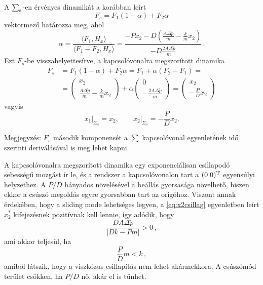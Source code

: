 A $\sum_{\rm s}$-en érvényes dinamikát a korábban leírt 
%
\begin{equation}
F_s = F_1 (1-\alpha) + F_2 \alpha 
\end{equation}
%
\noindent vektormező határozza meg, ahol
%
\begin{equation}
\alpha = \frac{\langle F_1, H_x \rangle}{\langle F_1-F_2, H_x \rangle} = \frac{-P x_2 -D \left(\frac{A \Delta \tilde{p}}{m} - \frac{k}{m} x_2\right)}{-D \frac{2A \Delta \tilde{p}}{m}} \,.
\end{equation}
%
\noindent Ezt $F_s$-be visszahelyettesítve, a kapcsolóvonalra megszorított dinamika
%
\begin{equation}
\begin{split}
F_s & = F_1 (1-\alpha) + F_2 \alpha = F_1 + \alpha (F_2-F_1) =  \\ & =
\begin{pmatrix}
x_2\\
\frac{A \Delta \tilde{p}}{m} - \frac{k}{m} x_2
\end{pmatrix} +
\alpha \begin{pmatrix}
0 \\
-\frac{2A \Delta \tilde{p}}{m}
\end{pmatrix} =
\begin{pmatrix}
x_2 \\
-\frac{P}{D}x_2
\end{pmatrix}
\end{split}
\end{equation}
%
\noindent vagyis
\begin{equation}
\left. \dot{x}_1 \right|_{\Sigma_s} = x_2, \qquad \left. \dot{x}_2 \right|_{\Sigma_s} = -\frac{P}{D} x_2.
\end{equation}
%

\underline{Megjegyzés:} $F_s$ második komponensét a $\sum$ kapcsolóvonal egyenletének idő szerinti deriválásával is meg lehet kapni.

A kapcsolóvonalra megszorított dinamika egy exponenciálisan csillapodó sebességű mozgást ír le, és a rendszer a kapcsolóvonalon tart a $(0 \; 0)^{\rm T}$ egyensúlyi helyzethez.  A $P/D$ hányados növelésével a beállás gyorsasága növelhető, hiszen ekkor a csúszó megoldás egyre gyorsabban tart az origóhoz. Viszont annak érdekében, hogy a sliding mode lehetséges legyen, a \eqref{eq:x2csillag} egyenletben leírt $x_2^*$ kifejezésnek pozitívnak kell lennie, így adódik, hogy 
%
\begin{equation}
\frac{D A \Delta \tilde{p}}{|D k - P m|} >0\,,
\end{equation}
%
\noindent ami akkor teljesül, ha
%
\begin{equation}
\frac{P}{D}m <k\,,
\end{equation}
%
\noindent amiből látszik, hogy a viszkózus csillapítás nem lehet akármekkora. A csúszómód terület csökken, ha $P/D$ nő, akár el is tűnhet.

